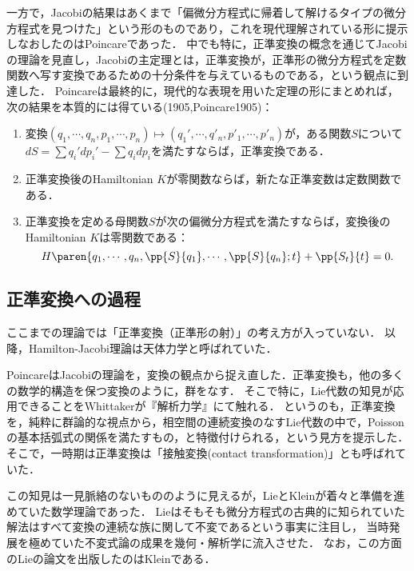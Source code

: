 \documentclass[uplatex,dvipdfmx]{jsreport}
\begin{document}
\begin{history}[Jacobiの定理]
    一方で，Jacobiの結果はあくまで「偏微分方程式に帰着して解けるタイプの微分方程式を見つけた」という形のものであり，これを現代理解されている形に提示しなおしたのはPoincareであった．
    中でも特に，正準変換の概念を通じてJacobiの理論を見直し，Jacobiの主定理とは，正準変換が，正準形の微分方程式を定数関数へ写す変換であるための十分条件を与えているものである，という観点に到達した．
    Poincareは最終的に，現代的な表現を用いた定理の形にまとめれば，次の結果を本質的には得ている(1905,Poincare1905)：
    \begin{theorem*}\mbox{}
        \begin{enumerate}
            \item 変換$(q_1,\cdots,q_n,p_1,\cdots,p_n)\mapsto(q_1',\cdots,q'_n,p'_1,\cdots,p'_n)$が，ある関数$S$について$dS=\sum q_i'dp_i'-\sum q_idp_i$を満たすならば，正準変換である．
            \item 正準変換後のHamiltonian $K$が零関数ならば，新たな正準変数は定数関数である．
            \item 正準変換を定める母関数$S$が次の偏微分方程式を満たすならば，変換後のHamiltonian $K$は零関数である：
            \[H\paren{q_1,\cdots,q_n,\pp{S}{q_1},\cdots,\pp{S}{q_n};t}+\pp{S_t}{t}=0.\]
        \end{enumerate}
    \end{theorem*}
\end{history}

\subsection{正準変換への過程}

\begin{tcolorbox}[colframe=ForestGreen, colback=ForestGreen!10!white,breakable,colbacktitle=ForestGreen!40!white,coltitle=black,fonttitle=\bfseries\sffamily,
title=]
    ここまでの理論では「正準変換（正準形の射）」の考え方が入っていない．
    以降，Hamilton-Jacobi理論は天体力学と呼ばれていた．
\end{tcolorbox}

\begin{history}[幾何学との出会い]
    PoincareはJacobiの理論を，変換の観点から捉え直した．正準変換も，他の多くの数学的構造を保つ変換のように，群をなす．
    そこで特に，Lie代数の知見が応用できることをWhittakerが『解析力学』にて触れる．
    というのも，正準変換を，純粋に群論的な視点から，相空間の連続変換のなすLie代数の中で，Poissonの基本括弧式の関係を満たすもの，と特徴付けられる，という見方を提示した．
    そこで，一時期は正準変換は「接触変換(contact transformation)」とも呼ばれていた．

    この知見は一見脈絡のないもののように見えるが，LieとKleinが着々と準備を進めていた数学理論であった．
    Lieはそもそも微分方程式の古典的に知られていた解法はすべて変換の連続な族に関して不変であるという事実に注目し，
    当時発展を極めていた不変式論の成果を幾何・解析学に流入させた．
    なお，この方面のLieの論文を出版したのはKleinである\cite{Bourbaki}．
\end{history}
\end{document}
